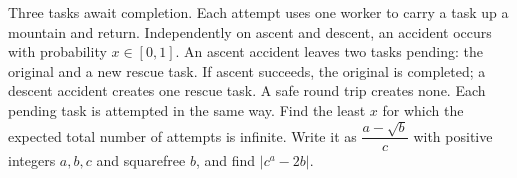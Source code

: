 Three tasks await completion. Each attempt uses one worker to carry a task up a mountain and return. Independently on ascent and descent, an accident occurs with probability $x\in[0,1]$. An ascent accident leaves two tasks pending: the original and a new rescue task. If ascent succeeds, the original is completed; a descent accident creates one rescue task. A safe round trip creates none. Each pending task is attempted in the same way. Find the least $x$ for which the expected total number of attempts is infinite. Write it as $\dfrac{a-\sqrt b}{c}$ with positive integers $a,b,c$ and squarefree $b$, and find $|c^a-2b|$.
